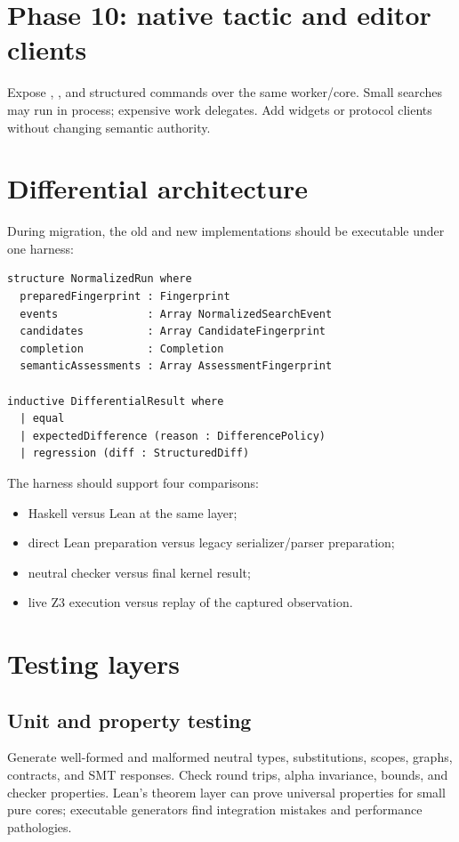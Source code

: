 \documentclass[10pt,letterpaper,oneside]{report}
\newcommand{\code}[1]{\texttt{\detokenize{#1}}}
\begin{document}
\section{Phase 10: native tactic and editor clients}

Expose \code{leant}, \code{leant?}, and structured commands over the same worker/core. Small searches may run in process; expensive work delegates. Add widgets or protocol clients without changing semantic authority.

\section{Differential architecture}

During migration, the old and new implementations should be executable under one harness:

\begin{lstlisting}[language=Leanish]
structure NormalizedRun where
  preparedFingerprint : Fingerprint
  events              : Array NormalizedSearchEvent
  candidates          : Array CandidateFingerprint
  completion          : Completion
  semanticAssessments : Array AssessmentFingerprint

inductive DifferentialResult where
  | equal
  | expectedDifference (reason : DifferencePolicy)
  | regression (diff : StructuredDiff)
\end{lstlisting}

The harness should support four comparisons:

\begin{itemize}
  \item Haskell versus Lean at the same layer;
  \item direct Lean preparation versus legacy serializer/parser preparation;
  \item neutral checker versus final kernel result;
  \item live Z3 execution versus replay of the captured observation.
\end{itemize}

\section{Testing layers}

\subsection{Unit and property testing}

Generate well-formed and malformed neutral types, substitutions, scopes, graphs, contracts, and SMT responses. Check round trips, alpha invariance, bounds, and checker properties. Lean's theorem layer can prove universal properties for small pure cores; executable generators find integration mistakes and performance pathologies.
\end{document}
